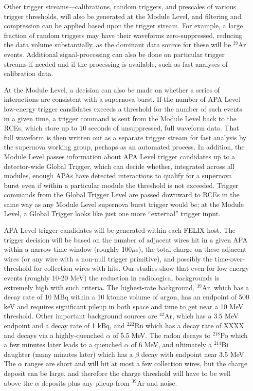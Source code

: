 	Other trigger streams---calibrations, random triggers, and prescales of
various trigger thresholds, will also be generated at the Module Level, and
filtering and compression can be applied based upon the trigger stream. For
example, a large fraction of random triggers may have their waveforms
zero-suppressed, reducing the data volume substantially, as the dominant data
source for these will be $^{39}$Ar events. Additional signal-processing can
also be done on particular trigger streams if needed and if the processing is
available, such as fast analyses of calibration data.

       At the Module Level, a decision can also be made on whether a series of
interactions are consistent with a supernova burst.  If the number of APA Level
low-energy trigger candidates exceeds a threshold for the number of such events
in a given time, a trigger command is sent from the Module Level back to the
RCEs, which store up to 10 seconds of unsuppressed, full waveform data.  That
full waveform is then written out as a separate trigger stream for fast
analysis by the supernova working group, perhaps as an automated process.  In
addition, the Module Level passes information about APA Level trigger
candidates  up to a detector-wide Global Trigger, which can decide whether,
integrated across all modules, enough APAs have detected interactions to
qualify for a supernova burst even if within a particular module the threshold
is not exceeded. Trigger commands from the Global Trigger Level are passed
downward to RCEs in the same way as any Module Level supernova burst trigger
would be; at the Module Level, a Global Trigger looks like just one more
``external'' trigger input.

	APA Level trigger candidates will be generated within each FELIX
host.  The trigger decision will be based on the number of adjacent wires hit
in a given APA within a narrow time window (roughly 100$\mu$s), the total
charge on these adjacent wires (or any wire with a non-null trigger primitive),
and possibly the time-over-threshold for collection wires with hits. Our
studies show that even for low-energy events (roughly 10-20 MeV) the reduction
in radiological backgrounds is extremely high with such criteria. The
highest-rate background, $^{39}$Ar, which has a decay rate of 10 MBq within a
10 ktonne volume of argon, has an endpoint of 500 keV and requires significant
pileup in both space and time to get near a 10 MeV threshold. Other important
background sources are $^{42}$Ar, which has a 3.5 MeV endpoint and a decay rate
of 1 kBq, and $^{222}$Rn which has a decay rate of XXXX and decays via a
highly-quenched $\alpha$ of 5.5 MeV.  The radon decays to $^{218}$Po which
a few minutes later leads to a quenched $\alpha$ of 6 MeV, and ultimately a
$^{214}$Bi daughter (many minutes later) which has a $\beta$ decay with
endpoint near 3.5 MeV.  The $\alpha$ ranges are short and will hit at most a
few collection wires, but the charge deposit can be large, and therefore the
charge threshold will have to be well above the $\alpha$ deposits plus any
pileup from $^{39}$Ar and noise.

